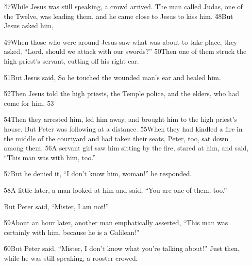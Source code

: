 \v{47}While Jesus was still speaking, a crowd arrived. The man called Judas, one of the Twelve, was leading them, and he came close to Jesus to kiss him. \v{48}But Jesus asked him, 

\v{49}When those who were around Jesus saw what was about to take place, they asked, ``Lord, should we attack with our swords?'' \v{50}Then one of them struck the high priest's servant, cutting off his right ear.

\v{51}But Jesus said,  So he touched the wounded man's ear and healed him.

\v{52}Then Jesus told the high priests, the Temple police, and the elders, who had come for him,  \v{53}

\v{54}Then they arrested him, led him away, and brought him to the high priest's house. But Peter was following at a distance. \v{55}When they had kindled a fire in the middle of the courtyard and had taken their seats, Peter, too, sat down among them. \v{56}A servant girl saw him sitting by the fire, stared at him, and said, ``This man was with him, too.''

\v{57}But he denied it, ``I don't know him, woman!'' he responded.

\v{58}A little later, a man looked at him and said, ``You are one of them, too.''

But Peter said, ``Mister, I am not!''

\v{59}About an hour later, another man emphatically asserted, ``This man was certainly with him, because he is a Galilean!''

\v{60}But Peter said, ``Mister, I don't know what you're talking about!'' Just then, while he was still speaking, a rooster crowed.

